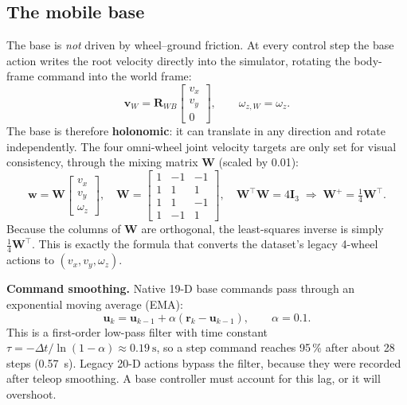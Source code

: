 \documentclass[10pt,a4paper]{article}
\newcommand{\T}{^{\!\top}}
\begin{document}
\subsection{The mobile base}\label{sec:base}
The base is \emph{not} driven by wheel--ground friction. At every control step the base action writes the root velocity directly into the simulator, rotating the body-frame command into the world frame:
\begin{equation}
\bm v_W=\bm R_{WB}\begin{bmatrix}v_x\\v_y\\0\end{bmatrix},\qquad \omega_{z,W}=\omega_z .
\end{equation}
The base is therefore \textbf{holonomic}: it can translate in any direction and rotate independently. The four omni-wheel joint velocity targets are only set for visual consistency, through the mixing matrix $\bm W$ (scaled by 0.01):
\begin{equation}
\bm w=\bm W\begin{bmatrix}v_x\\v_y\\\omega_z\end{bmatrix},\quad
\bm W=\begin{bmatrix}1&-1&-1\\1&1&1\\1&1&-1\\1&-1&1\end{bmatrix},\quad
\bm W\T\bm W=4\bm I_3\;\Rightarrow\;\bm W^{+}=\tfrac14\bm W\T .
\end{equation}
Because the columns of $\bm W$ are orthogonal, the least-squares inverse is simply $\tfrac14\bm W\T$. This is exactly the formula that converts the dataset's legacy 4-wheel actions to $(v_x,v_y,\omega_z)$.

\textbf{Command smoothing.} Native 19-D base commands pass through an exponential moving average (EMA):
\begin{equation}
\bm u_k=\bm u_{k-1}+\alpha(\bm r_k-\bm u_{k-1}),\qquad\alpha=0.1 .
\end{equation}
This is a first-order low-pass filter with time constant $\tau=-\Delta t/\ln(1-\alpha)\approx\SI{0.19}{\second}$, so a step command reaches 95\,\% after about 28 steps (\SI{0.57}{\second}). Legacy 20-D actions bypass the filter, because they were recorded after teleop smoothing. A base controller must account for this lag, or it will overshoot.

\end{document}
